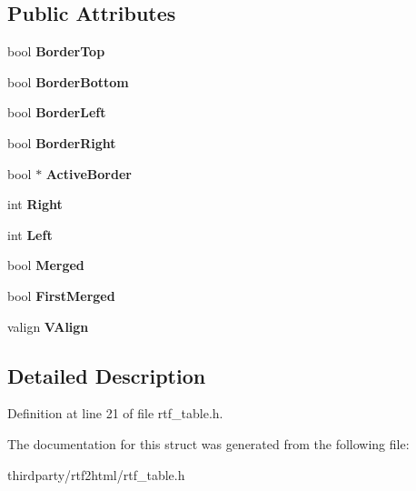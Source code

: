 \subsection*{Public Attributes}
\begin{DoxyCompactItemize}
\item 
\mbox{\label{structtable__cell__def_a4dc7bf81a1d134f756e5116461b630a8}} 
bool {\bfseries Border\+Top}
\item 
\mbox{\label{structtable__cell__def_af73eeee897f138ce3cd76edc9c9d3d3b}} 
bool {\bfseries Border\+Bottom}
\item 
\mbox{\label{structtable__cell__def_a390776ecfae1a1b4e95a39da8c4d1186}} 
bool {\bfseries Border\+Left}
\item 
\mbox{\label{structtable__cell__def_a9a689d3223928611208f46cfade0ae37}} 
bool {\bfseries Border\+Right}
\item 
\mbox{\label{structtable__cell__def_a2160c98df0eb7d99774b0fa31939fdf6}} 
bool $\ast$ {\bfseries Active\+Border}
\item 
\mbox{\label{structtable__cell__def_a4cf2b81e5b2e3a46b1aff97d12dfce8b}} 
int {\bfseries Right}
\item 
\mbox{\label{structtable__cell__def_a7f912ecdb8ef0e41173f9d3c3f6ebd27}} 
int {\bfseries Left}
\item 
\mbox{\label{structtable__cell__def_acd8e85cf58cf9eabdd2720859c8204bc}} 
bool {\bfseries Merged}
\item 
\mbox{\label{structtable__cell__def_a61489d130739e06d5fd1fa59bf6121a0}} 
bool {\bfseries First\+Merged}
\item 
\mbox{\label{structtable__cell__def_ad58773d805b4e0d97395567f3f5d66da}} 
valign {\bfseries V\+Align}
\end{DoxyCompactItemize}


\subsection{Detailed Description}


Definition at line 21 of file rtf\+\_\+table.\+h.



The documentation for this struct was generated from the following file\+:\begin{DoxyCompactItemize}
\item 
thirdparty/rtf2html/rtf\+\_\+table.\+h\end{DoxyCompactItemize}
